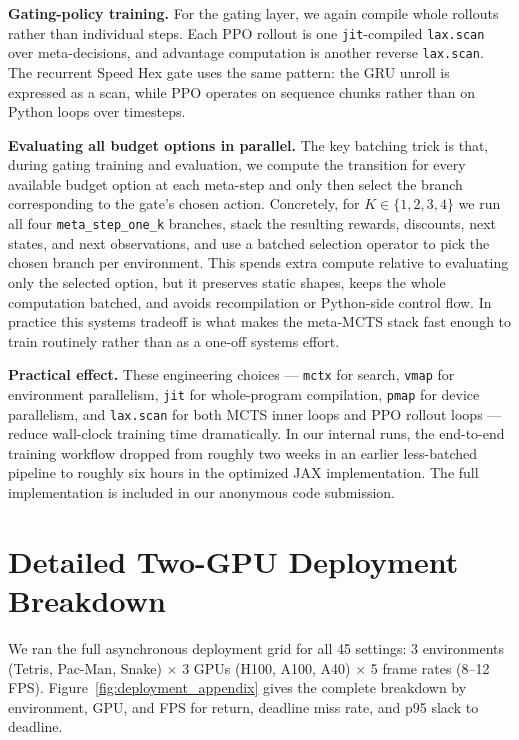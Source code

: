 \textbf{Gating-policy training.}
For the gating layer, we again compile whole rollouts rather than individual steps.
Each PPO rollout is one \texttt{jit}-compiled \texttt{lax.scan} over meta-decisions,
and advantage computation is another reverse \texttt{lax.scan}. The recurrent Speed
Hex gate uses the same pattern: the GRU unroll is expressed as a scan, while PPO
operates on sequence chunks rather than on Python loops over timesteps.

\textbf{Evaluating all budget options in parallel.}
The key batching trick is that, during gating training and evaluation, we compute
the transition for every available budget option at each meta-step and only then
select the branch corresponding to the gate's chosen action. Concretely, for
$K \in \{1,2,3,4\}$ we run all four \texttt{meta\_step\_one\_k} branches, stack the
resulting rewards, discounts, next states, and next observations, and use a batched
selection operator to pick the chosen branch per environment. This spends extra
compute relative to evaluating only the selected option, but it preserves static
shapes, keeps the whole computation batched, and avoids recompilation or Python-side
control flow. In practice this systems tradeoff is what makes the meta-MCTS stack
fast enough to train routinely rather than as a one-off systems effort.

\textbf{Practical effect.}
These engineering choices --- \texttt{mctx} for search, \texttt{vmap} for environment
parallelism, \texttt{jit} for whole-program compilation, \texttt{pmap} for device
parallelism, and \texttt{lax.scan} for both MCTS inner loops and PPO rollout loops ---
reduce wall-clock training time dramatically. In our internal runs, the end-to-end
training workflow dropped from roughly two weeks in an earlier less-batched pipeline
to roughly six hours in the optimized JAX implementation. The full implementation is
included in our anonymous code submission.


\section{Detailed Two-GPU Deployment Breakdown}
\label{app:deployment_details}

We ran the full asynchronous deployment grid for all 45 settings:
3 environments (Tetris, Pac-Man, Snake) $\times$ 3 GPUs (H100, A100, A40)
$\times$ 5 frame rates (8--12\,FPS).
Figure~\ref{fig:deployment_appendix} gives the complete breakdown by environment,
GPU, and FPS for return, deadline miss rate, and p95 slack to deadline.

